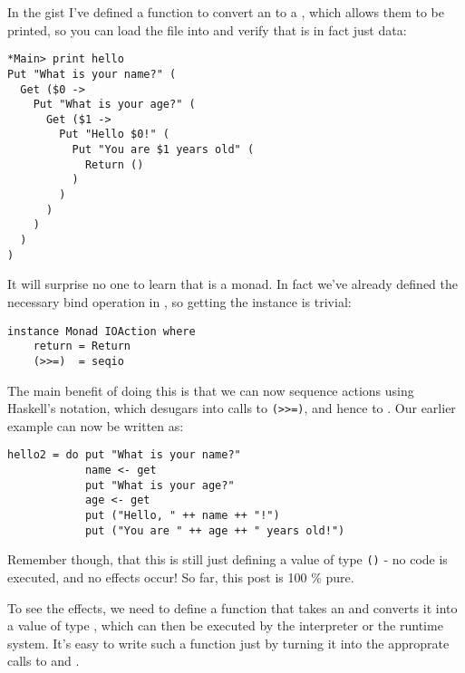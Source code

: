 \documentclass[thesis-solanki.tex]{subfiles}
\begin{document}
In the gist
 I've defined a function to convert an  to a , which allows them to be printed, so you can load the file into  
and verify that  is in fact just data:

\begin{verbatim}
*Main> print hello
Put "What is your name?" (
  Get ($0 -> 
    Put "What is your age?" (
      Get ($1 -> 
        Put "Hello $0!" (
          Put "You are $1 years old" (
            Return ()
          )
        )
      )
    )
  )
)
\end{verbatim}
It will surprise no one to learn that  is a monad. In fact we've already defined the necessary bind operation in , so getting 
the  instance is trivial:
\begin{verbatim}
instance Monad IOAction where
    return = Return
    (>>=)  = seqio
\end{verbatim}

The main benefit of doing this is that we can now sequence actions using Haskell's
 notation, which desugars into calls to \Verb!(>>=)!, and 
hence to . Our earlier  example can now be written as:
\par
\begin{verbatim}
hello2 = do put "What is your name?"
            name <- get
            put "What is your age?"
            age <- get
            put ("Hello, " ++ name ++ "!")
            put ("You are " ++ age ++ " years old!")
\end{verbatim}
Remember though, that this is still just defining a value of type 
 \Verb!()! -
no code is executed, and no effects occur! So far, this post is 100 \% pure.

To see the effects, we need to define a function that takes an   and converts it into a value of type  , which can then be executed by the interpreter or the runtime system. It's easy to write such a function just by turning it into the approprate calls to  and .
\end{document}
